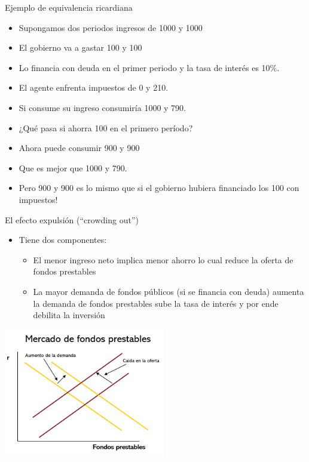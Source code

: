 \documentclass{beamer}
\begin{document}
\begin{frame}{Ejemplo de equivalencia ricardiana}
    
    \begin{itemize}
        \item Supongamos dos periodos ingresos de 1000 y 1000
        \item El gobierno va a gastar 100 y 100 
        \item Lo financia con deuda en el primer periodo y la tasa de interés es 10\%.
        \item El agente enfrenta impuestos de 0 y 210.
        \item Si consume su ingreso consumiría 1000 y 790. 
        \item ¿Qué pasa si ahorra 100 en el primero período?
    \item Ahora puede consumir 900 y 900
    \item Que es mejor que 1000 y 790.
    \item Pero 900 y 900 es lo mismo que si el gobierno hubiera financiado los 100 con impuestos! 
        
        
    \end{itemize}

\end{frame}


\begin{frame}{El efecto expulsión (“crowding out”)}

    \begin{itemize}
    \footnotesize\item Tiene dos componentes:
        \begin{itemize}
        \scriptsize\item El menor ingreso neto implica menor ahorro lo cual reduce la oferta de fondos prestables
        \scriptsize\item La mayor demanda de fondos públicos (si se financia con deuda) aumenta la demanda de fondos prestables sube la tasa de interés y por ende debilita la inversión
        \scriptsize\end{itemize}
    \end{itemize}
    
    \vspace{0.2cm}
    
    \centering\includegraphics[width=7cm]{P87.png}\

\end{frame}
\end{document}
